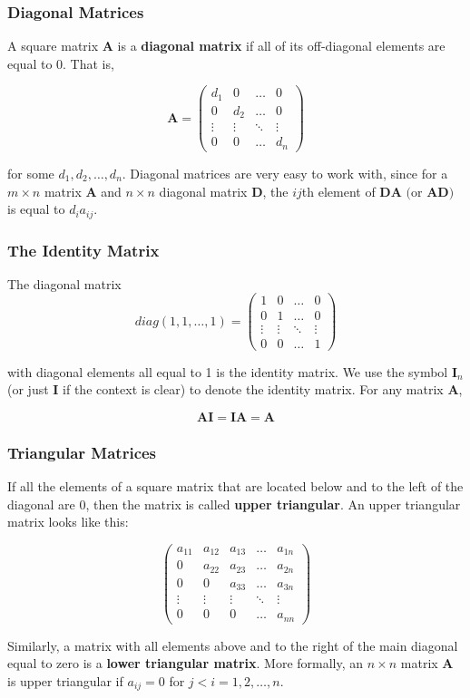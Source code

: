 \documentclass{beamer}
\begin{document}
\begin{frame}
\frametitle{Diagonal Matrices}
A square matrix $\mathbf{A}$ is a \textbf{diagonal matrix} if all of its off-diagonal elements are equal to 0.  That is,

\[\mathbf{A} = 
\begin{pmatrix}
    d_{1} & 0 & \dots  & 0 \\
    0 & d_{2}  & \dots  & 0 \\
    \vdots & \vdots  & \ddots & \vdots \\
    0 & 0  & \dots  & d_{n}
\end{pmatrix}
\]

for some $d_1, d_2, \hdots, d_n$.  Diagonal matrices are very easy to work with, since for a $m \times n$ matrix $\mathbf{A}$ and $n \times n$ diagonal matrix $\mathbf{D}$, the $ij$th element of $\mathbf{DA} \text{ (or }\mathbf{AD})$ is equal to $d_i a_{ij}$.  
\end{frame}

\begin{frame}
\frametitle{The Identity Matrix}
The diagonal matrix
\[diag(1,1,\hdots, 1) = 
\begin{pmatrix}
    1 & 0 & \dots  & 0 \\
    0 & 1  & \dots  & 0 \\
    \vdots & \vdots  & \ddots & \vdots \\
    0 & 0  & \dots  & 1
\end{pmatrix}
\]

with diagonal elements all equal to 1 is the identity matrix.  We use the symbol $\mathbf{I}_n$ (or just $\mathbf{I}$ if the context is clear) to denote the identity matrix.  For any matrix $\mathbf{A}$,

\[\mathbf{AI} = \mathbf{IA} = \mathbf{A}\]
\end{frame}

\begin{frame}
\frametitle{Triangular Matrices}
If all the elements of a square matrix that are located below and to the left of the diagonal are 0, then the matrix is called \textbf{upper triangular}.  An upper triangular matrix looks like this:

\[\begin{pmatrix}
    a_{11} & a_{12} & a_{13}& \dots  & a_{1n} \\
    0 & a_{22}  & a_{23} & \dots  & a_{2n} \\
        0 & 0  & a_{33} & \dots  & a_{3n} \\
    \vdots & \vdots & \vdots  & \ddots & \vdots \\
    0 & 0  & 0 & \dots  & a_{nn}
\end{pmatrix}
\]

Similarly, a matrix with all elements above and to the right of the main diagonal equal to zero is a \textbf{lower triangular matrix}.  More formally, an $n \times n$ matrix $\mathbf{A}$ is upper triangular if $a_{ij} = 0$ for $j < i = 1, 2, \hdots, n$.  
\end{frame}
\end{document}
